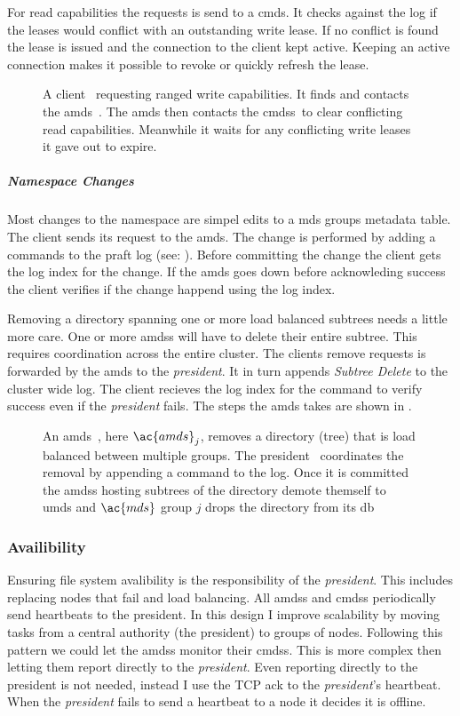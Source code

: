 For read capabilities the requests is send to a \ac{cmds}. It checks against the \raft{} log if the leases would conflict with an outstanding write lease. If no conflict is found the lease is issued and the connection to the client kept active. Keeping an active connection makes it possible to revoke or quickly refresh the lease.
%
\begin{figure}[htbp]
	\centering
	
	\caption{A client~\clientLeg{} requesting ranged write capabilities. It finds and contacts the \ac{amds}~\amdsLeg{}. The \ac{amds} then contacts the \acp{cmds}~\cmdsLeg to clear conflicting read capabilities. Meanwhile it waits for any conflicting write leases it gave out to expire.}
	\label{fig:write}
\end{figure}
%
\subparagraph*{Namespace Changes}
Most changes to the namespace are simpel edits to a \ac{mds} groups metadata table. The client sends its request to the \ac{amds}. The change is performed by adding a commands to the \ac{praft} log (see: ). Before committing the change the client gets the log index for the change. If the \ac{amds} goes down before acknowleding success the client verifies if the change happend using the log index.

Removing a directory spanning one or more load balanced subtrees needs a little more care. One or more \acp{amds} will have to delete their entire subtree. This requires coordination across the entire cluster. The clients remove requests is forwarded by the \ac{amds} to the \textit{president}. It in turn appends \textsl{Subtree Delete} to the cluster wide log. The client recieves the log index for the command to verify success even if the \textit{president} fails. The steps the \ac{amds} takes are shown in . 
%
\begin{figure}[htbp]
	\centering
	
	\caption{An \ac{amds}~\amdsLeg{}, here $\ac{amds}_j$, removes a directory (tree) that is load balanced between multiple groups. The president~\presidentLeg{} coordinates the removal by appending a command to the log. Once it is committed the \acp{amds} hosting subtrees of the directory demote themself to \ac{umds} and $\ac{mds}$ group $j$ drops the directory from its db}
	\label{fig:rm}
\end{figure}
%
\subsubsection*{Availibility}
Ensuring file system avalibility is the responsibility of the \textit{president}. This includes replacing nodes that fail and load balancing. All \acp{amds} and \acp{cmds} periodically send heartbeats to the president. In this design I improve scalability by moving tasks from a central authority (the president) to groups of nodes. Following this pattern we could let the \acp{amds} monitor their \acp{cmds}. This is more complex then letting them report directly to the \textit{president}. Even reporting directly to the president is not needed, instead I use the TCP ack to the \textit{president}'s \raft{} heartbeat. When the \textit{president} fails to send a \raft{} heartbeat to a node it decides it is offline.

